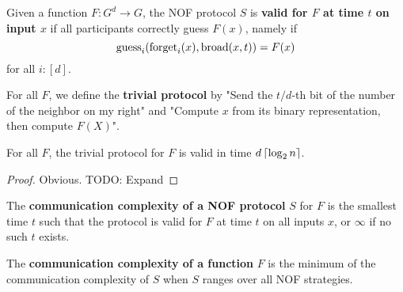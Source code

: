 \begin{definition}
  \label{def:valid-protocol}
  \leanok

  Given a function $F : G^d \to G$, the NOF protocol $S$ is {\bf valid for $F$ at time $t$ on input $x$} if all participants correctly guess $F(x)$, namely if
  $$\operatorname{guess}_i(\operatorname{forget}_i(x), \operatorname{broad}(x, t)) = F(x)$$
  for all $i : [d]$.
\end{definition}

\begin{definition}
  \label{def:trivial-protocol}

  For all $F$, we define the {\bf trivial protocol} by "Send the $t / d$-th bit of the number of the neighbor on my right" and "Compute $x$ from its binary representation, then compute $F(X)$".
\end{definition}

\begin{lemma}
  \label{lem:trivial-protocol-valid}

  For all $F$, the trivial protocol for $F$ is valid in time $d\left\lceil \log_2 n\right\rceil$.
\end{lemma}
\begin{proof}

  Obvious. TODO: Expand
\end{proof}

\begin{definition}
  \label{def:protocol-complexity}
  \leanok

  The {\bf communication complexity of a NOF protocol} $S$ for $F$ is the smallest time $t$ such that the protocol is valid for $F$ at time $t$ on all inputs $x$, or $\infty$ if no such $t$ exists.
\end{definition}

\begin{definition}
  \label{def:function-complexity}
  \leanok

  The {\bf communication complexity of a function} $F$ is the minimum of the communication complexity of $S$ when $S$ ranges over all NOF strategies.
\end{definition}

